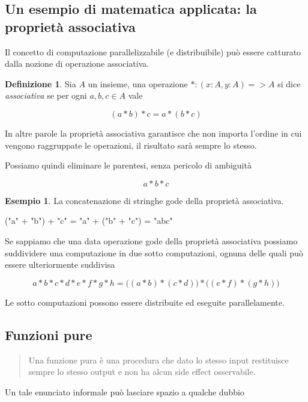 \documentclass[12pt]{article}
\theoremstyle{definition}
\newtheorem{definition}{Definizione}[section]
\newtheorem{example}{Esempio}[section]
\newenvironment{code}
  {\vspace{0.5cm} \VerbatimEnvironment\begin{typescriptcode}}
  {\end{typescriptcode} \vspace{0.2cm}}
\begin{document}
\subsection{Un esempio di matematica applicata: la proprietà associativa}

Il concetto di computazione parallelizzabile (e distribuibile) può essere catturato dalla nozione di operazione associativa.

\begin{definition}
Sia $A$ un insieme, una operazione $*: (x: A, y: A) => A$ si dice \emph{associativa} se per ogni $a, b, c \in A$ vale

$$
(a * b) * c = a * ( b * c )
$$
\end{definition}

In altre parole la proprietà associativa garantisce che non importa l'ordine in cui vengono raggruppate le operazioni, il risultato sarà sempre lo stesso.

Possiamo quindi eliminare le parentesi, senza pericolo di ambiguità

$$
a * b * c
$$

\begin{example}
La concatenazione di stringhe gode della proprietà associativa.

\begin{code}
("a" + "b") + "c" = "a" + ("b" + "c") = "abc"
\end{code}
\end{example}

Se sappiamo che una data operazione gode della proprietà associativa possiamo suddividere una computazione in due sotto computazioni, ognuna delle quali può essere ulteriormente suddivisa

$$
a * b * c * d * e * f * g * h = \Big( ( a * b ) * ( c * d ) \Big) * \Big( ( e * f ) * ( g * h ) \Big)
$$

Le sotto computazioni possono essere distribuite ed eseguite parallelamente.

\subsection{Funzioni pure}

\begin{quote}
Una funzione pura è una procedura che dato lo stesso input restituisce sempre lo stesso output e non ha alcun side effect osservabile.
\end{quote}

Un tale enunciato informale può lasciare spazio a qualche dubbio
\end{document}
